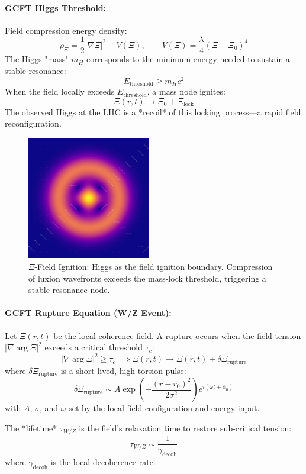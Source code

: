 \paragraph{GCFT Higgs Threshold:}
Field compression energy density:
\[
\rho_\Xi = \frac{1}{2} |\nabla \Xi|^2 + V(\Xi), \qquad V(\Xi) = \frac{\lambda}{4} (\Xi - \Xi_0)^4
\]
The Higgs "mass" $m_H$ corresponds to the minimum energy needed to sustain a stable resonance:
\[
E_{\text{threshold}} \geq m_H c^2
\]
When the field locally exceeds $E_{\text{threshold}}$, a mass node ignites:
\[
\Xi(r, t) \to \Xi_0 + \Xi_{\text{lock}}
\]
The observed Higgs at the LHC is a *recoil* of this locking process—a rapid field reconfiguration.

\begin{figure}[ht]
\centering
\includegraphics[width=0.48\textwidth]{figures/xi_higgs_ignition_overlay.png}
\caption{$\Xi$-Field Ignition: Higgs as the field ignition boundary. Compression of luxion wavefronts exceeds the mass-lock threshold, triggering a stable resonance node.}
\label{fig:higgs_field}
\end{figure}

\paragraph{GCFT Rupture Equation (W/Z Event):}
Let $\Xi(r,t)$ be the local coherence field.  
A rupture occurs when the field tension $|\nabla\arg\Xi|^2$ exceeds a critical threshold $\tau_c$:
\[
|\nabla\arg\Xi|^2 \geq \tau_c \implies \Xi(r, t) \to \Xi(r, t) + \delta\Xi_{\text{rupture}}
\]
where $\delta\Xi_{\text{rupture}}$ is a short-lived, high-torsion pulse:
\[
\delta\Xi_{\text{rupture}} \sim A \exp\left(-\frac{(r - r_0)^2}{2\sigma^2}\right) e^{i(\omega t + \phi_0)}
\]
with $A$, $\sigma$, and $\omega$ set by the local field configuration and energy input.

The *lifetime* $\tau_{W/Z}$ is the field’s relaxation time to restore sub-critical tension:
\[
\tau_{W/Z} \sim \frac{1}{\gamma_{\text{decoh}}}
\]
where $\gamma_{\text{decoh}}$ is the local decoherence rate.

